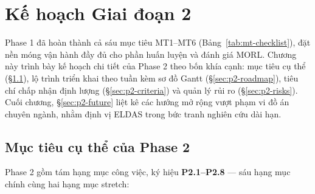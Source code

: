 \chapter{Kế hoạch Giai đoạn 2}
\label{chap:ke-hoach}

Phase 1 đã hoàn thành cả sáu mục tiêu MT1--MT6
(Bảng~\ref{tab:mt-checklist}), đặt nền móng vận hành đầy đủ cho phần
huấn luyện và đánh giá MORL. Chương này trình bày kế hoạch chi tiết
của Phase 2 theo bốn khía cạnh: mục tiêu cụ thể
(§\ref{sec:p2-goals}), lộ trình triển khai theo tuần kèm sơ đồ Gantt
(§\ref{sec:p2-roadmap}), tiêu chí chấp nhận định lượng
(§\ref{sec:p2-criteria}) và quản lý rủi ro
(§\ref{sec:p2-risks}). Cuối chương, §\ref{sec:p2-future} liệt kê các
hướng mở rộng vượt phạm vi đồ án chuyên ngành, nhằm định vị ELDAS
trong bức tranh nghiên cứu dài hạn.


\section{Mục tiêu cụ thể của Phase 2}
\label{sec:p2-goals}

Phase 2 gồm tám hạng mục công việc, ký hiệu \textbf{P2.1--P2.8} ---
sáu hạng mục chính cùng hai hạng mục stretch:

